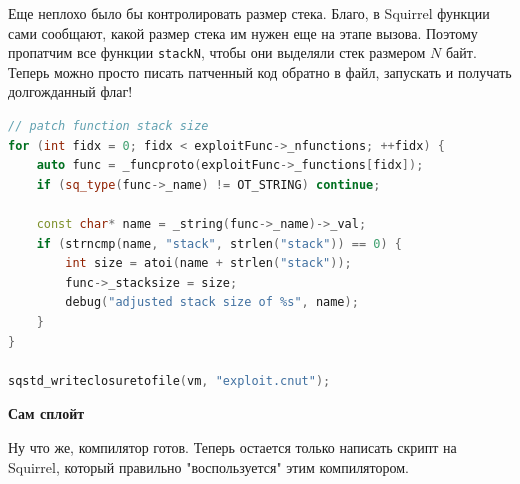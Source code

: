 \documentclass[idxtotoc,hyperref,openany,oneside]{files/pwn} %
\begin{document}
Еще неплохо было бы контролировать размер стека. Благо, в Squirrel функции сами сообщают, какой размер стека им нужен еще на этапе вызова. Поэтому пропатчим все функции \verb|stackN|, чтобы они выделяли стек размером $N$ байт. Теперь можно просто писать патченный код обратно в файл, запускать и получать долгожданный флаг!
\begin{lstlisting}[language=C++,
                   directivestyle={\color{black}}
                   emph={int,char,double,float,unsigned},
                   emphstyle={\color{blue}}
                  ]
// patch function stack size
for (int fidx = 0; fidx < exploitFunc->_nfunctions; ++fidx) {
    auto func = _funcproto(exploitFunc->_functions[fidx]);
    if (sq_type(func->_name) != OT_STRING) continue;

    const char* name = _string(func->_name)->_val;
    if (strncmp(name, "stack", strlen("stack")) == 0) {
        int size = atoi(name + strlen("stack"));
        func->_stacksize = size;
        debug("adjusted stack size of %s", name);
    }
}

sqstd_writeclosuretofile(vm, "exploit.cnut");
\end{lstlisting}

\textbf{Сам сплойт}

Ну что же, компилятор готов. Теперь остается только написать скрипт на Squirrel, который правильно "воспользуется" этим компилятором.
\end{document}
